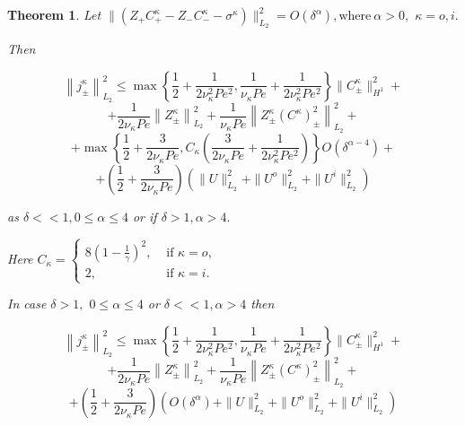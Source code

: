 \documentclass[10pt,a4paper]{amsart}
\newtheorem{theorem}{Theorem}
\begin{document}
\begin{theorem}\label{j_estimates}
Let  $\|\left(Z_{+}C^{\kappa}_{+}-Z_{-}C^{\kappa}_{-}-\sigma^{\kappa}\right)\|_{L_2}^2=O(\delta^\alpha), \text{where}\  \alpha >0, $  $\kappa=o,i.$

Then 

$$
\left\|j^{\kappa}_{\pm}\right\|^2_{L_2}\leq \max{\left\lbrace\frac{1}{2}+\frac{1}{2\nu_{\kappa}^2Pe^2},\frac{1}{\nu_{\kappa}Pe}+\frac{1}{2\nu_{\kappa}^2Pe^2}\right\rbrace}\|C^{\kappa}_{\pm}\|^2_{H^1}+$$
$$+\frac{1}{2\nu_{\kappa}Pe}\left\|Z^{\kappa}_{\pm}\right\|^2_{L_2}+\frac{1}{\nu_{\kappa}Pe}\left\|Z^{\kappa}_{\pm}(C^{\kappa})^2_{\pm}\right\|^2_{L_2}+ $$
$$+\max{\left\lbrace\frac{1}{2}+\frac{3}{2\nu_{\kappa}Pe},C_{\kappa}\left(\frac{3}{2\nu_{\kappa}Pe}+\frac{1}{2\nu_{\kappa}^2Pe^2}\right)\right\rbrace}O(\delta^{\alpha-4})+
$$
$$+\left(\frac{1}{2}+\frac{3}{2\nu_{\kappa}Pe}\right)\left(\|U\|_{L_2}^2+\|U^o\|_{L_2}^2+\|U^i\|_{L_2}^2\right)$$

as $\delta<<1,0\leq \alpha\leq 4$ or if $\delta>1, \alpha > 4.$

Here 
$C_{\kappa}=\begin{cases}8(1-\frac{1}{\gamma})^2,  & \text{ if } \kappa=o,\\
2, & \text { if } \kappa=i.
\end{cases}$

In case $\delta>1,$  $0\leq \alpha\leq 4$  or  $\delta<<1, \alpha> 4 $ then 

$$
\left\|j^{\kappa}_{\pm}\right\|^2_{L_2}\leq \max{\left\lbrace\frac{1}{2}+\frac{1}{2\nu_{\kappa}^2Pe^2},\frac{1}{\nu_{\kappa}Pe}+\frac{1}{2\nu_{\kappa}^2Pe^2}\right\rbrace}\|C^{\kappa}_{\pm}\|^2_{H^1}+$$
$$+\frac{1}{2\nu_{\kappa}Pe}\left\|Z^{\kappa}_{\pm}\right\|^2_{L_2}+\frac{1}{\nu_{\kappa}Pe}\left\|Z^{\kappa}_{\pm}(C^{\kappa})^2_{\pm}\right\|^2_{L_2}+ $$
$$+\left(\frac{1}{2}+\frac{3}{2\nu_{\kappa}Pe}\right)\left(O(\delta^{\alpha})+\|U\|_{L_2}^2+\|U^o\|_{L_2}^2+\|U^i\|_{L_2}^2\right)$$


\end{theorem}
\end{document}
